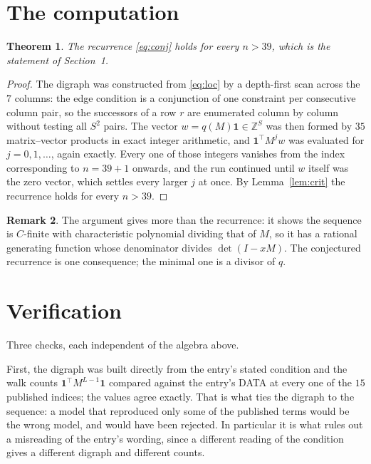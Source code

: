 \documentclass[11pt,a4paper]{article}
\theoremstyle{plain}
\newtheorem{theorem}{Theorem}
\theoremstyle{definition}
\newtheorem{remark}[theorem]{Remark}
\begin{document}
\section{The computation}

\begin{theorem}
The recurrence \eqref{eq:conj} holds for every $n>39$, which is the statement of
Section~1.
\end{theorem}

\begin{proof}
The digraph was constructed from \eqref{eq:loc} by a depth-first scan across the $7$
columns: the edge condition is a conjunction of one constraint per consecutive column
pair, so the successors of a row $r$ are enumerated column by column without testing all
$S^2$ pairs. The vector $w=q(M)\mathbf{1}\in\mathbb{Z}^{S}$ was then formed by $35$
matrix--vector products in exact integer arithmetic, and $\mathbf{1}^{\!\top}M^{j}w$ was
evaluated for $j=0,1,\dots$, again exactly. Every one of those integers vanishes from the
index corresponding to $n=39+1$ onwards, and the run continued until $w$ itself was the
zero vector, which settles every larger $j$ at once. By Lemma~\ref{lem:crit} the recurrence
holds for every $n>39$.
\end{proof}

\begin{remark}
The argument gives more than the recurrence: it shows the sequence is $C$-finite with
characteristic polynomial dividing that of $M$, so it has a rational generating function
whose denominator divides $\det(I-xM)$. The conjectured recurrence is one consequence; the
minimal one is a divisor of $q$.
\end{remark}

\section{Verification}

Three checks, each independent of the algebra above.

First, the digraph was built directly from the entry's stated condition and the walk counts
$\mathbf{1}^{\!\top}M^{L-1}\mathbf{1}$ compared against the entry's DATA at
every one of the $15$ published indices; the values agree exactly. That is what ties
the digraph to the sequence: a model that reproduced only some of the published terms would
be the wrong model, and would have been rejected. In particular it is what rules out a
misreading of the entry's wording, since a different reading of the condition gives a
different digraph and different counts.
\end{document}
